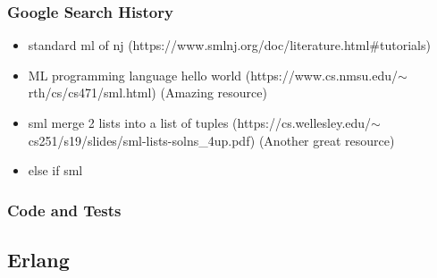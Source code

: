 \documentclass[letterpaper, 10pt, DIV=13]{scrartcl}
\numberwithin{equation}{section}
\numberwithin{figure}{section}
\numberwithin{table}{section}
\begin{document}
\subsubsection{Google Search History}
\begin{itemize}
    \item standard ml of nj (https://www.smlnj.org/doc/literature.html\#tutorials)
    \item ML programming language hello world (https://www.cs.nmsu.edu/$\sim$rth/cs/cs471/sml.html) (Amazing resource)
    \item sml merge 2 lists into a list of tuples (https://cs.wellesley.edu/$\sim$cs251/s19/slides/sml-lists-solns\_4up.pdf) (Another great resource)
    \item else if sml
\end{itemize}

\subsubsection{Code and Tests}



\subsection{Erlang}
\end{document}
